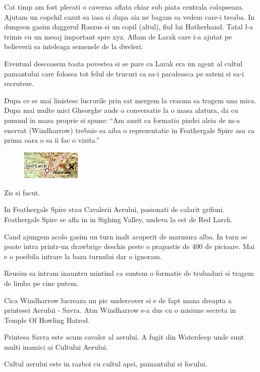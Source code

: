 \documentclass[12pt,oneside]{book}
\begin{document}
Cat timp am fost plecati o caverna aflata chiar sub piata centrala colapseaza. Ajutam un copchil cazut sa iasa si dupa aia ne bagam sa vedem care-i treaba. In dungeon gasim daggerul Raszus si un copil (altul), fiul lui Hatherhand. Tatal l-a trimis cu un mesaj important spre xyz. Aflam de Larak care i-a ajutat pe believerii sa inteleaga semenele de la dweleri.

Eventual descoasem toata povestea si se pare ca Larak era un agent al cultul pamantului care folosea tot felul de trucuri ca sa-i pacaleasca pe sateni si sa-i recruteze.

Dupa ce se mai linistesc lucrurile prin sat mergem la crasma sa tragem una mica.
Dupa mai multe mici Gheorghe aude o conversatie la o masa alatura, da cu pumnul in masa 
proprie si spune:
``Am auzit ca formatia pizdei aleia de m-a enervat (Windharrow) trebuie sa aiba o 
reprezentatie in Feathergale Spire  asa ca prima oara o sa ii fac o vizita.''

\begin{figure}
    \centering
    \includegraphics[width=0.25\textwidth]{images/maps/path-to-feathergale-spire}
\end{figure}

Zis si facut.

In Feathergale Spire stau Cavalerii Aerului, pasionati de calarit grifoni. Feathergale Spire se afla in in Sighing Valley, undeva la est de Red Larch.

Cand ajungem acolo gasim un turn inalt acoperit de marmura alba. In turn se poate intra
printr-un drawbrige deschis peste o prapastie de 400 de picioare. Mai e o posibila intrare 
la baza turnului dar o ignoram.

Reusim sa intram inauntru mintind ca suntem o formatie de trubaduri si tragem de
limba pe cine putem.

Cica Windharrow lucreaza un pic undercover si e de fapt mana dreapta
a printesei Aerului - Savra. Atm Windharrow s-a dus cu o misiune secreta 
in Temple Of Howling Hatred.

Printesa Savra este acum cavaler al aerului. A fugit din Waterdeep unde sunt multi inamici ai Cultului Aerului.

Cultul aerului este in razboi cu cultul apei, pamantului si focului.
\end{document}
